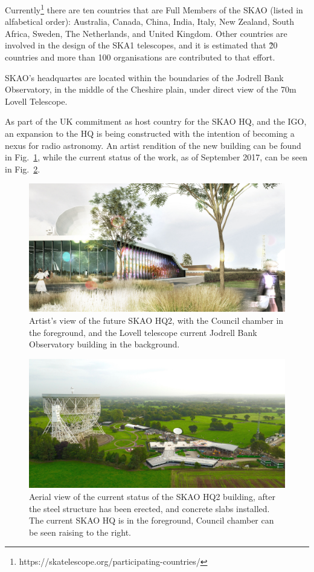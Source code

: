 \documentclass[a4paper,
               biblatex,       %
               keeplastbox,    %
               ]{jacow-2_1}    %
\begin{document}
Currently\footnote{https://skatelescope.org/participating-countries/} there are ten countries that are Full Members of the SKAO (listed in alfabetical order): Australia, Canada, China, India, Italy, New Zealand, South Africa, Sweden, The Netherlands, and United Kingdom. Other countries are involved in the design of the SKA1 telescopes, and it is estimated that \~20 countries and more than 100 organisations are contributed to that effort.

SKAO's headquartes are located within the boundaries of the Jodrell Bank Observatory, in the middle of the Cheshire plain, under direct view of the 70m Lovell Telescope.

As part of the UK commitment as host country for the SKAO HQ, and the IGO, an expansion to the HQ is being constructed with the intention of becoming a nexus for radio astronomy. An artist rendition of the new building can be found in Fig.~\ref{fig:SKA-HQ-render}, while the current status of the work, as of September 2017, can be seen in Fig.~\ref{fig:SKA-HQ2-aerial}.

\begin{figure}[!htb]
  \centering
    \includegraphics[width=\columnwidth]{figs/SKA-HQ-render.jpg}
  \caption{Artist's view of the future SKAO HQ2, with the Council chamber in the foreground, and the Lovell telescope current Jodrell Bank Observatory building in the background.}
  \label{fig:SKA-HQ-render}
\end{figure}

\begin{figure}[!htb]
  \centering
    \includegraphics[width=\columnwidth]{figs/SKA-HQ2-aerial.jpg}
  \caption{Aerial view of the current status of the SKAO HQ2 building, after the steel structure has been erected, and concrete slabs installed. The current SKAO HQ is in the foreground, Council chamber can be seen raising to the right.}
  \label{fig:SKA-HQ2-aerial}
\end{figure}
\end{document}
